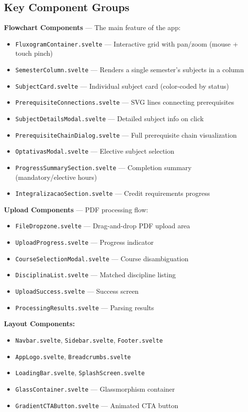 \documentclass[11pt,a4paper]{article}
\newcommand{\code}[1]{\texttt{#1}}
\begin{document}
\subsection{Key Component Groups}

\noindent\textbf{Flowchart Components} — The main feature of the app:
\begin{itemize}[noitemsep]
    \item \code{FluxogramContainer.svelte} — Interactive grid with pan/zoom (mouse + touch pinch)
    \item \code{SemesterColumn.svelte} — Renders a single semester's subjects in a column
    \item \code{SubjectCard.svelte} — Individual subject card (color-coded by status)
    \item \code{PrerequisiteConnections.svelte} — SVG lines connecting prerequisites
    \item \code{SubjectDetailsModal.svelte} — Detailed subject info on click
    \item \code{PrerequisiteChainDialog.svelte} — Full prerequisite chain visualization
    \item \code{OptativasModal.svelte} — Elective subject selection
    \item \code{ProgressSummarySection.svelte} — Completion summary (mandatory/elective hours)
    \item \code{IntegralizacaoSection.svelte} — Credit requirements progress
\end{itemize}

\noindent\textbf{Upload Components} — PDF processing flow:
\begin{itemize}[noitemsep]
    \item \code{FileDropzone.svelte} — Drag-and-drop PDF upload area
    \item \code{UploadProgress.svelte} — Progress indicator
    \item \code{CourseSelectionModal.svelte} — Course disambiguation
    \item \code{DisciplinaList.svelte} — Matched discipline listing
    \item \code{UploadSuccess.svelte} — Success screen
    \item \code{ProcessingResults.svelte} — Parsing results
\end{itemize}

\noindent\textbf{Layout Components:}
\begin{itemize}[noitemsep]
    \item \code{Navbar.svelte}, \code{Sidebar.svelte}, \code{Footer.svelte}
    \item \code{AppLogo.svelte}, \code{Breadcrumbs.svelte}
    \item \code{LoadingBar.svelte}, \code{SplashScreen.svelte}
    \item \code{GlassContainer.svelte} — Glassmorphism container
    \item \code{GradientCTAButton.svelte} — Animated CTA button
\end{itemize}
\end{document}
